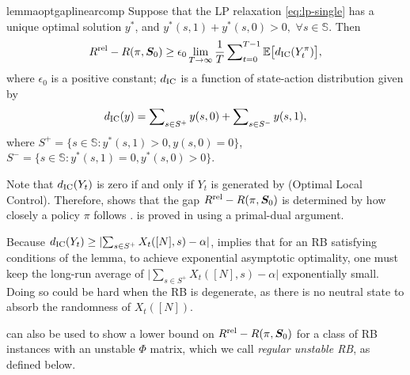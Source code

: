 \documentclass[11pt,letterpaper]{article}
\theoremstyle{plain}
\theoremstyle{definition}
\theoremstyle{remark}
\newcommand{\Ebig}[1]{\mathbb{E}\big[#1\big]}
\newcommand{\absplain}[1]{\lvert#1\rvert}
\newcommand{\ve}[1]{\bm{#1}}
\newcommand{\veS}{\ve{S}}
\newcommand{\sspa}{\mathbb{S}}
\newcommand{\rel}{\textup{rel}} %
\newcommand{\ravg}{R}
\newcommand{\rsysn}{\ravg(\pi, \veS_0)}
\newcommand{\rrel}{\ravg^\rel}
\newcommand{\rewardgap}{\epsilon_0}
\newcommand{\disy}{d_{\textup{IC}}}
\begin{document}
\begin{restatable}{lemma}{optgaplinearcomp}\label{lem:opt-gap-linear-comp}
   Suppose that the LP relaxation \eqref{eq:lp-single} has a unique optimal solution $y^*$, and $y^*(s,1) + y^*(s,0) > 0,$ $\forall s\in\sspa$. Then 
   \vspace{-8pt}
    \begin{equation}
        \rrel - \rsysn \geq \rewardgap \lim_{T\to\infty} \frac{1}{T} \sum\nolimits_{t=0}^{T-1} \Ebig{\disy(Y_t^{\pi})},
    \end{equation}
    where $\rewardgap$ is a positive constant; $\disy$ is a function of state-action distribution given by 
    \[
        \disy(y) = \sum\nolimits_{s\in S^+} y(s,0)+ \sum\nolimits_{s\in S^-}y(s,1),
    \]
    where $S^+ = \{s\in\sspa\colon y^*(s,1) > 0, y(s,0) = 0\}$, $S^- = \{s\in\sspa\colon y^*(s,1) = 0, y^*(s,0) > 0\}$. 
\end{restatable}




Note that $\disy(Y_t)$ is zero if and only if $Y_t$ is generated by  (Optimal Local Control). Therefore,  shows that the gap $\rrel - \rsysn$ is determined by how closely a policy $\pi$  follows .
 is proved  in  using a primal-dual argument. 

Because $\disy(Y_t) \geq \absplain{\sum_{s\in S^+} X_t([N],s) - \alpha}$,  implies that for an RB satisfying conditions of the lemma, to achieve exponential asymptotic optimality, one must keep the long-run average of $\absplain{\sum_{s\in S^+} X_t([N],s) - \alpha}$ exponentially small. Doing so could be hard when the RB is degenerate, as there is no neutral state to absorb the randomness of $X_t([N])$. 


 can also be used to show a lower bound on $\rrel - \rsysn$ for a class of RB instances with an unstable $\Phi$ matrix, which we call \emph{regular unstable RB}, as defined below. 
\fi
\end{document}
